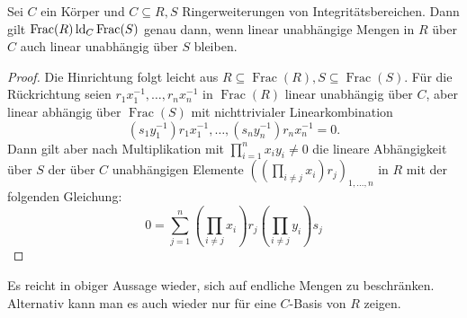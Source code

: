     \begin{lemma}\label{Fraktionskörper}
    	Sei $C$ ein Körper und $C\subseteq R,S$ Ringerweiterungen von Integritätsbereichen. Dann gilt $\operatorname{Frac}(R)\operatorname{ld}_C\operatorname{Frac}(S)$ genau dann, wenn linear unabhängige Mengen in $R$ über $C$ auch linear unabhängig über $S$ bleiben.
    \end{lemma}
    \begin{proof}
    	Die Hinrichtung folgt leicht aus $R\subseteq\operatorname{Frac}(R),S\subseteq\operatorname{Frac}(S)$. Für die Rückrichtung seien $r_1x_1^{-1},\dots,r_nx_n^{-1}$ in $\operatorname{Frac}(R)$ linear unabhängig über $C$, aber linear abhängig über $\operatorname{Frac}(S)$ mit nichttrivialer Linearkombination $$(s_1y_1^{-1})r_1x_1^{-1},\dots,(s_ny_n^{-1})r_nx_n^{-1}=0.$$\newpage
    	Dann gilt aber nach Multiplikation mit $\prod\limits_{i=1}^nx_iy_i\neq0$ die lineare Abhängigkeit über $S$ der über $C$ unabhängigen Elemente $((\prod\limits_{i\neq j}x_i)r_j)_{1,\dots,n}$ in $R$ mit der folgenden Gleichung: $$0=\sum\limits_{j=1}^n(\prod\limits_{i\neq j}x_i)r_j(\prod\limits_{i\neq j}y_i)s_j$$
    \end{proof}
    
    \begin{remark}
    	Es reicht in obiger Aussage wieder, sich auf endliche Mengen zu beschränken. Alternativ kann man es auch wieder nur für eine $C$-Basis von $R$ zeigen.
    \end{remark}
    
